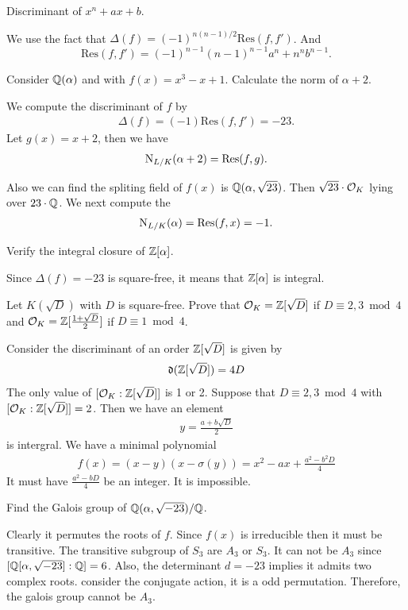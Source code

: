 {\prob Discriminant of $x^n+ax+b$.

We use the fact that $\Delta(f)=(-1)^{n(n-1)/2}\text{Res}(f,f')$. And 
$$\text{Res}(f,f')=(-1)^{n-1}(n-1)^{n-1}a^n+n^nb^{n-1}.$$

\prob Consider $\mathbb{Q}(\alpha)$ and with $f(x)=x^3-x+1$. Calculate the norm of $\alpha+2$.

We compute the discriminant of $f$ by 
\begin{align*}
    \Delta(f) = (-1)\text{Res}(f,f') =-23. 
\end{align*}
Let $g(x)=x+2$, then we have 
\begin{align*}
    \operatorname{N}_{L/K}(\alpha+2) =  \text{Res}(f,g).
\end{align*}

Also we can find the spliting field of $f(x)$ is $\mathbb{Q}(\alpha,\sqrt{23})$. 
Then $\sqrt{23}\cdot \mathcal{O}_K $ lying over $23\cdot \mathbb{Q}$. We next compute the 
\begin{align*}
    \operatorname{N}_{L/K}(\alpha) = \text{Res}(f,x) = -1.
\end{align*} 

\prob Verify the integral closure of $\mathbb{Z}[\alpha]$. 

Since $\Delta(f) = -23$ is square-free, it means that $\mathbb{Z}[\alpha]$ is integral. 

\prob Let $K(\sqrt{D})$ with $D$ is square-free. Prove that $\mathcal{O}_K=\mathbb{Z}[\sqrt{D}]$ if $D\equiv 2,3\bmod 4$ and $\mathcal{O}_K=\mathbb{Z}[\frac{1+\sqrt{D}}{2}]$ if $D\equiv 1\bmod 4$. 

Consider the discriminant of an order $\mathbb{Z}[\sqrt{D}]$ is given by 
\begin{align*}
    \mathfrak{d}(\mathbb{Z}[\sqrt{D}]) = 4D
\end{align*}
The only value of $[\mathcal{O}_K:\mathbb{Z}[\sqrt{D}]]$ is 1 or 2.
Suppose that $D\equiv 2,3\bmod 4$ with $[\mathcal{O}_K:\mathbb{Z}[\sqrt{D}]]=2$. Then we have an element
\begin{align*}
    y = \frac{a+b\sqrt{D}}{2}
\end{align*}
is intergral. We have a minimal polynomial
\begin{align*}
    f(x) = (x-y)(x-\sigma(y)) = x^2-ax+\frac{a^2-b^2 D}{4}
\end{align*}
It must have $\frac{a^2-bD}{4}$ be an integer. It is impossible.

\prob Find the Galois group of $\mathbb{Q}(\alpha,\sqrt{-23})/\mathbb{Q}$.

Clearly it permutes the roots of $f$. Since $f(x)$ is irreducible then it must be transitive.
The transitive subgroup of $S_3$ are $A_3$ or $S_3$. It can not be $A_3$ since $[\mathbb{Q}[\alpha,\sqrt{-23}]:\mathbb{Q}]=6$.
Also, the determinant $d=-23$ implies it admits two complex roots. consider the conjugate action, it is a odd permutation.
Therefore, the galois group cannot be $A_3$.





}
